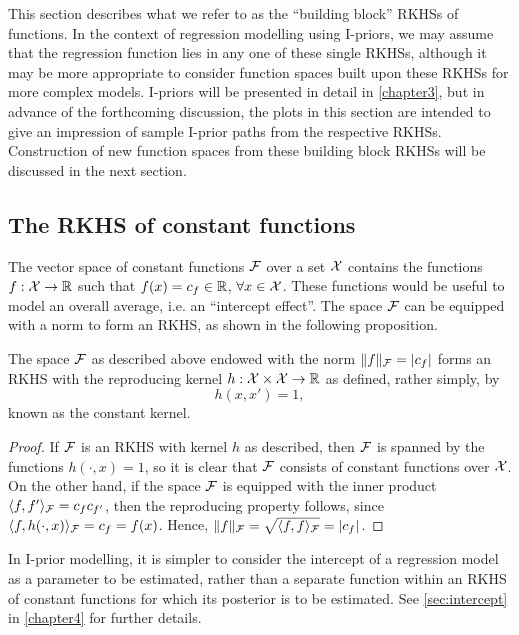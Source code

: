 This section describes what we refer to as the ``building block'' RKHSs of functions.
In the context of regression modelling using I-priors, we may assume that the regression function lies in any one of these single RKHSs, although it may be more appropriate to consider function spaces built upon these RKHSs for more complex models.
I-priors will be presented in detail in \cref{chapter3}, but in advance of the forthcoming discussion, the plots in this section are intended to give an impression of sample I-prior paths from the respective RKHSs.
Construction of new function spaces from these building block RKHSs will be discussed in the next section.

\subsection{The RKHS of constant functions}

The vector space of constant functions ${\mathcal F}$ over a set ${\mathcal X}$ contains the functions $f:{\mathcal X} \to \mathbb{R}$ such that $f(x) = c_f \in \mathbb{R}$, $\forall x \in {\mathcal X}$.
These functions would be useful to model an overall average, i.e. an ``intercept effect''.
The space ${\mathcal F}$ can be equipped with a norm to form an RKHS, as shown in the following proposition.

\begin{proposition}
  The space ${\mathcal F}$ as described above endowed with the norm $\lVert f\rVert_{\mathcal F} = \vert c_f \vert$ forms an RKHS with the reproducing kernel $h:{\mathcal X}\times{\mathcal X}\to\mathbb{R}$ as defined, rather simply, by
  \[
    h(x,x') = 1,
  \]
  known as the constant kernel.
\end{proposition}

\begin{proof}
  If ${\mathcal F}$ is an RKHS with kernel $h$ as described, then ${\mathcal F}$ is spanned by the  functions $h(\cdot,x) = 1$, so it is clear that ${\mathcal F}$ consists of constant functions over ${\mathcal X}$.
  On the other hand, if the space ${\mathcal F}$ is equipped with the inner product $\langle f,f'\rangle_{\mathcal F} = c_f c_{f'}$, then the reproducing property follows, since $\langle f,h(\cdot,x)\rangle_{\mathcal F} = c_f = f(x)$.
  Hence, $\lVert f\rVert_{\mathcal F} = \sqrt{\langle f,f\rangle_{\mathcal F}} = \vert c_f \vert$.
\end{proof}

\begin{remark}
  In I-prior modelling, it is simpler to consider the intercept of a regression model as a parameter to be estimated, rather than a separate function within an RKHS of constant functions for which its posterior is to be estimated.
  See \cref{sec:intercept}  in \cref{chapter4} for further details.  
\end{remark}

